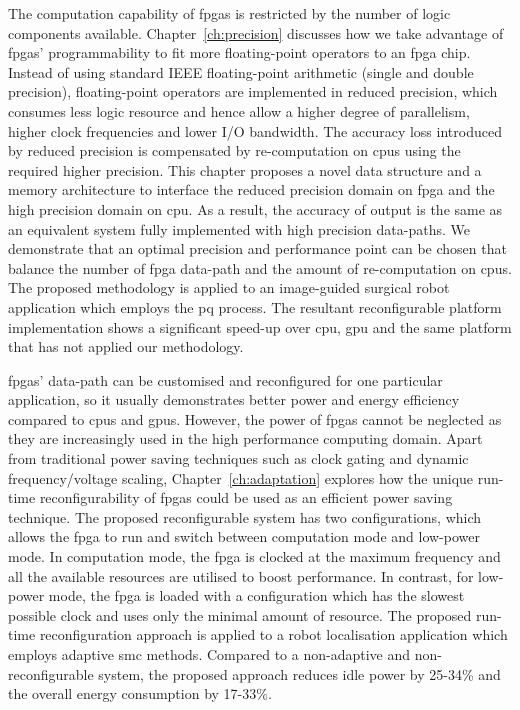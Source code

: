 The computation capability of \glspl{fpga} is restricted by the number of logic components available.
Chapter~\ref{ch:precision} discusses how we take advantage of \glspl{fpga}' programmability to fit more floating-point operators to an \gls{fpga} chip.
Instead of using standard IEEE floating-point arithmetic (single and double precision), floating-point operators are implemented in reduced precision, which consumes less logic resource and hence allow a higher degree of parallelism, higher clock frequencies and lower I/O bandwidth.
The accuracy loss introduced by reduced precision is compensated by re-computation on \glspl{cpu} using the required higher precision.
This chapter proposes a novel data structure and a memory architecture to interface the reduced precision domain on \gls{fpga} and the high precision domain on \gls{cpu}.
As a result, the accuracy of output is the same as an equivalent system fully implemented with high precision data-paths.
We demonstrate that an optimal precision and performance point can be chosen that balance the number of \gls{fpga} data-path and the amount of re-computation on \glspl{cpu}.
The proposed methodology is applied to an image-guided surgical robot application which employs the \gls{pq} process.
The resultant reconfigurable platform implementation shows a significant speed-up over \gls{cpu}, \gls{gpu} and the same platform that has not applied our methodology.

\glspl{fpga}' data-path can be customised and reconfigured for one particular application, so it usually demonstrates better power and energy efficiency compared to \glspl{cpu} and \glspl{gpu}.
However, the power of \glspl{fpga} cannot be neglected as they are increasingly used in the high performance computing domain.
Apart from traditional power saving techniques such as clock gating and dynamic frequency/voltage scaling, Chapter~\ref{ch:adaptation} explores how the unique run-time reconfigurability of \glspl{fpga} could be used as an efficient power saving technique.
The proposed reconfigurable system has two configurations, which allows the \gls{fpga} to run and switch between computation mode and low-power mode.
In computation mode, the \gls{fpga} is clocked at the maximum frequency and all the available resources are utilised to boost performance.
In contrast, for low-power mode, the \gls{fpga} is loaded with a configuration which has the slowest possible clock and uses only the minimal amount of resource.
The proposed run-time reconfiguration approach is applied to a robot localisation application which employs adaptive \gls{smc} methods.
Compared to a non-adaptive and non-reconfigurable system, the proposed approach reduces idle power by 25-34\% and the overall energy consumption by 17-33\%.

